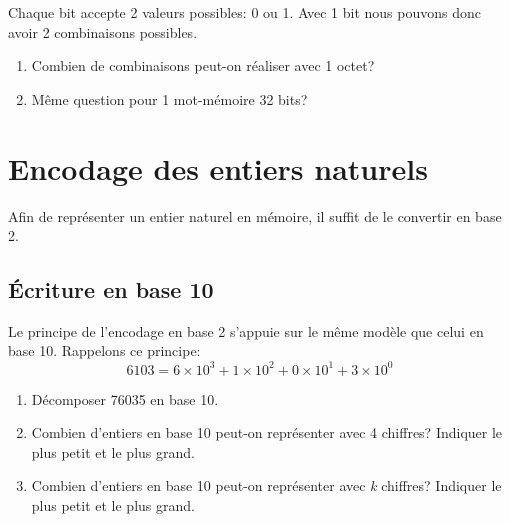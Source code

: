 \documentclass[a4paper,11pt]{article}
\begin{document}
\begin{Form}
\begin{figure}[!h]
\end{figure}
\begin{activite}
Chaque bit accepte 2 valeurs possibles: 0 ou 1. Avec 1 bit nous pouvons donc avoir 2 combinaisons possibles.
\begin{enumerate}
\item Combien de combinaisons peut-on réaliser avec 1 octet?
\item Même question pour 1 mot-mémoire 32 bits?
\end{enumerate}
\end{activite}
\section{Encodage des entiers naturels}
Afin de représenter un entier naturel en mémoire, il suffit de le convertir en base 2.
\subsection{Écriture en base 10}
Le principe de l'encodage en base 2 s'appuie sur le même modèle que celui en base 10. Rappelons ce principe:
$$6103 = 6×10^3 + 1×10^2 + 0×10^1 + 3×10^0$$
\begin{activite}
\begin{enumerate}
\item Décomposer 76035 en base 10.
\item Combien d'entiers en base 10 peut-on représenter avec 4 chiffres? Indiquer le plus petit et le plus grand.
\item Combien d'entiers en base 10 peut-on représenter avec \emph{k} chiffres? Indiquer le plus petit et le plus grand.
\end{enumerate}
\end{activite}

\end{Form}
\end{document}
